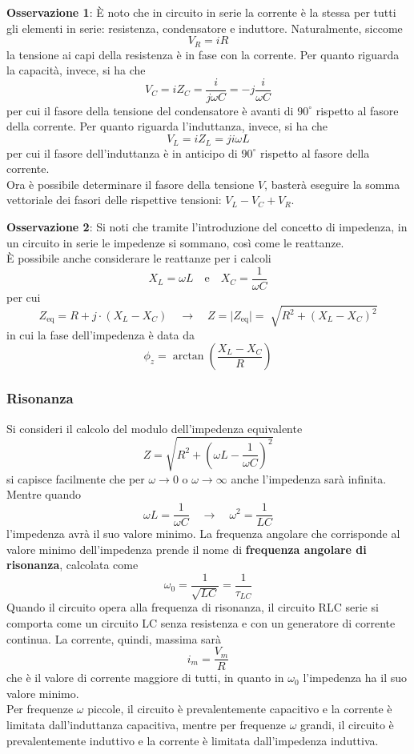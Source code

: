 \documentclass[a4paper]{extarticle}
\begin{document}
\vspace{2em}
\noindent
\textbf{Osservazione 1}: È noto che in circuito in serie la corrente è la stessa per tutti gli elementi in serie: resistenza, condensatore e induttore. Naturalmente, siccome
\[V_R=i R\]
la tensione ai capi della resistenza è in fase con la corrente. Per quanto riguarda la capacità, invece, si ha che
\[V_C = i Z_C = \dfrac{i}{j \omega C} = -j \dfrac{i}{\omega C}\]
per cui il fasore della tensione del condensatore è avanti di $90^\circ$ rispetto al fasore della corrente. Per quanto riguarda l'induttanza, invece, si ha che
\[V_L=i Z_L = j i \omega L\]
per cui il fasore dell'induttanza è in anticipo di $90^\circ$ rispetto al fasore della corrente.\\
Ora è possibile determinare il fasore della tensione $V$, basterà eseguire la somma vettoriale dei fasori delle rispettive tensioni: $V_L-V_C+V_R$.

\vspace{2em}
\noindent
\textbf{Osservazione 2}: Si noti che tramite l'introduzione del concetto di impedenza, in un circuito in serie le impedenze si sommano, così come le reattanze.\\
È possibile anche considerare le reattanze per i calcoli
\[X_L=\omega L \hspace{1em} \text{e} \hspace{1em} X_C=\dfrac{1}{\omega C}\]
per cui
\[Z_\text{eq} = R + j \cdot (X_L-X_C) \hspace{1em} \rightarrow \hspace{1em} Z=\vert Z_\text{eq} \vert=\sqrt[]{R^2+(X_L-X_C)^2}\]
in cui la fase dell'impedenza è data da
\[\phi_z=\arctan \left(\dfrac{X_L-X_C}{R}\right)\]

\vspace{2em}
\noindent
\subsubsection{Risonanza}
Si consideri il calcolo del modulo dell'impedenza equivalente
\[Z=\sqrt{R^2+\left(\omega L - \dfrac{1}{\omega C}\right)^2}\]
si capisce facilmente che per $\omega \to 0$ o $\omega \to \infty$ anche l'impedenza sarà infinita. Mentre quando
\[\omega L = \dfrac{1}{\omega C} \hspace{1em} \rightarrow \hspace{1em} \omega^2 = \dfrac{1}{LC}\]
l'impedenza avrà il suo valore minimo. La frequenza angolare che corrisponde al valore minimo dell'impedenza prende il nome di \textbf{frequenza angolare di risonanza}, calcolata come
\[\boxed{\omega_0=\dfrac{1}{\sqrt{LC}} = \dfrac{1}{\tau_{LC}}}\]
Quando il circuito opera alla frequenza di risonanza, il circuito RLC serie si comporta come un circuito LC senza resistenza e con un generatore di corrente continua. La corrente, quindi, massima sarà
\[i_m = \dfrac{V_m}{R}\]
che è il valore di corrente maggiore di tutti, in quanto in $\omega_0$ l'impedenza ha il suo valore minimo.\\
Per frequenze $\omega$ piccole, il circuito è prevalentemente capacitivo e la corrente è limitata dall'induttanza capacitiva, mentre per frequenze $\omega$ grandi, il circuito è prevalentemente induttivo e la corrente è limitata dall'impedenza induttiva.
\end{document}
